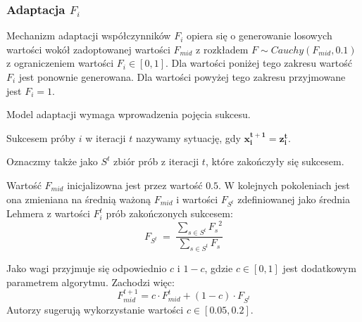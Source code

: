 \documentclass[12pt,a4paper]{report}
\begin{document}
{{{\begin{description}
\subsubsection{Adaptacja $F_i$}
\par{
Mechanizm adaptacji współczynników $F_i$ opiera się o generowanie losowych wartości wokół zadoptowanej wartości $F_{mid}$ z rozkładem $F \sim Cauchy(F_{mid}, 0.1)$ z ograniczeniem wartości $F_i \in [0, 1]$. Dla wartości poniżej tego zakresu wartość $F_i$ jest ponownie generowana. Dla wartości powyżej tego zakresu przyjmowane jest $F_i = 1$.
}
\par{
Model adaptacji wymaga wprowadzenia pojęcia sukcesu.
\par{
\begin{OptDefinition}
Sukcesem próby $i$ w iteracji $t$ nazywamy sytuację, gdy $\mathbf{x_i^{t+1} = z_i^t}$.
\end{OptDefinition}
}
Oznaczmy także jako $S^t$ zbiór prób z iteracji $t$, które zakończyły się sukcesem.
}
\par{
Wartość $F_{mid}$ inicjalizowna jest przez wartość $0.5$. W kolejnych pokoleniach jest ona zmieniana na średnią ważoną $F_{mid}$ i wartości $F_{S^t}$ zdefiniowanej jako średnia Lehmera z wartości $F_{i}^{t}$ prób zakończonych sukcesem:
}
\begin{equation}
F_{S^t}~=~\frac{\sum_{s \in S^t} {F_s}^2}{\sum_{s \in S^t} {F_s}}
\end{equation}

\par{
Jako wagi przyjmuje się odpowiednio $c$ i $1 - c$, gdzie $c \in [0,1]$ jest dodatkowym parametrem algorytmu. Zachodzi więc:
\begin{equation}
\label{eq:AdaptationJADEFormula}
F_{mid}^{t+1} = c \cdot F_{mid}^t + (1 - c) \cdot F_{S^t}
\end{equation}
Autorzy \cite{JADE} sugerują wykorzystanie wartości $c \in [0.05, 0.2]$.
}


\end{description}}}}
\end{document}
